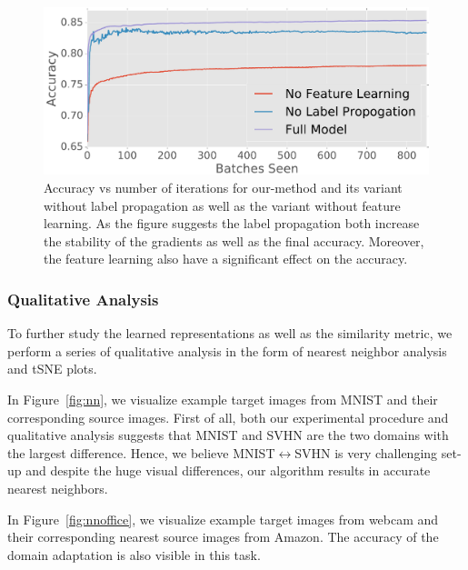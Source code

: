 \begin{figure}[ht]
\vspace{-1mm}
\includegraphics[width=\columnwidth]{no_feature_propogation}
\vspace{-6mm}
\caption{Accuracy vs number of iterations for our-method and its variant without label propagation as well as the variant without feature learning. As the figure suggests the label propagation both increase the stability of the gradients as well as the final accuracy. Moreover, the feature learning also have a significant effect on the accuracy.}
\label{fllprop}
\end{figure}

\vspace{-2mm}
\subsubsection{Qualitative Analysis}
To further study the learned representations as well as the similarity metric, we perform a series of qualitative analysis in the form of nearest neighbor analysis and tSNE\cite{tsne} plots.

In Figure~\ref{fig:nn}, we visualize example target images from MNIST and their corresponding source images. First of all, both our experimental procedure and qualitative analysis suggests that MNIST and SVHN are the two domains with the largest difference. Hence, we believe MNIST$\leftrightarrow$SVHN is very challenging set-up and despite the huge visual differences, our algorithm results in accurate nearest neighbors.

In Figure~\ref{fig:nnoffice},  we visualize example target images from webcam and their corresponding nearest source images from Amazon. The accuracy of the domain adaptation is also visible in this task. 


